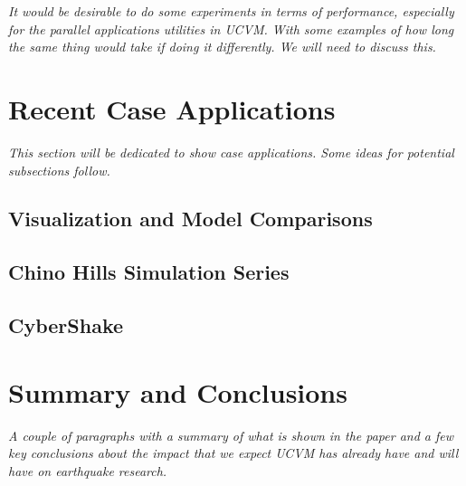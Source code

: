 \textit{
\color{blue}
It would be desirable to do some experiments in terms of performance, especially for the parallel applications utilities in UCVM. With some examples of how long the same thing would take if doing it differently. We will need to discuss this.
}

\section{Recent Case Applications}
\label{sec:conclusions}

\textit{
\color{blue}
This section will be dedicated to show case applications. Some ideas for potential subsections follow.
}

\subsection{Visualization and Model Comparisons}

\subsection{Chino Hills Simulation Series}

\subsection{CyberShake}

\section{Summary and Conclusions}
\label{sec:conclusions}

\textit{
\color{blue}
A couple of paragraphs with a summary of what is shown in the paper and a few key conclusions about the impact that we expect UCVM has already have and will have on earthquake research.
}

